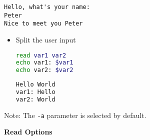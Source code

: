 \documentclass{article}
\newcommand{\inlinecode}[1]{\colorbox{backcolour}{\footnotesize{\texttt{#1}}}}
\begin{document}
\begin{itemize}
\begin{paracol}{2}
		      \begin{lstlisting}[style=terminal]
Hello, what's your name:
Peter
Nice to meet you Peter
\end{lstlisting}

		      \begin{itemize}

			      \item Split the user input

			            \begin{lstlisting}[style=command, language=Bash]
read var1 var2
echo var1: $var1
echo var2: $var2
\end{lstlisting}

			            \begin{lstlisting}[style=terminal,language=Bash]
Hello World
var1: Hello
var2: World
\end{lstlisting}

		      \end{itemize}

		      Note: The \inlinecode{-a} parameter is selected by default.


		      \switchcolumn

		      \textbf{Read Options}


\end{paracol}
\end{itemize}
\end{document}
